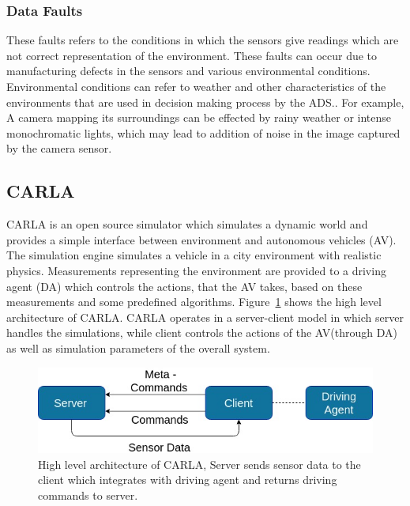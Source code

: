  \subsubsection{Data Faults} These faults refers to the conditions in which the sensors give readings which are not correct representation of the environment. These faults can occur due to manufacturing defects in the sensors and various environmental conditions. Environmental conditions can refer to weather and other characteristics of the environments that are used in decision making process by the ADS.. For example, A camera mapping its surroundings can be effected by rainy weather or intense monochromatic lights, which may lead to addition of noise in the image captured by the camera sensor.
 
 \subsection{CARLA} \label{ri-carla}
 CARLA is an open source simulator which simulates a dynamic world and provides a simple interface between environment and autonomous vehicles (AV). The simulation engine simulates a vehicle in a city environment with realistic physics. Measurements representing the environment are provided to a driving agent (DA) which  controls the actions, that the AV takes, based on these measurements and some predefined algorithms. Figure~\ref{fig:carla_arch} shows the high level architecture of CARLA. CARLA operates in a server-client model in which server handles the simulations, while client controls the actions of the AV(through DA) as well as simulation parameters of the overall system. 
 
 
 \begin{figure}  [h]
 	\vspace{-0.5em}
 	\centering
 	\includegraphics[scale=0.4]{CARLA_block}
 	\vspace{-0.5em}
 	\caption{High level architecture of CARLA, Server sends sensor data to the client which integrates with driving agent and returns driving commands to server.}
 	\label{fig:carla_arch}
 	\vspace{-1.5em}
 \end{figure}
 
